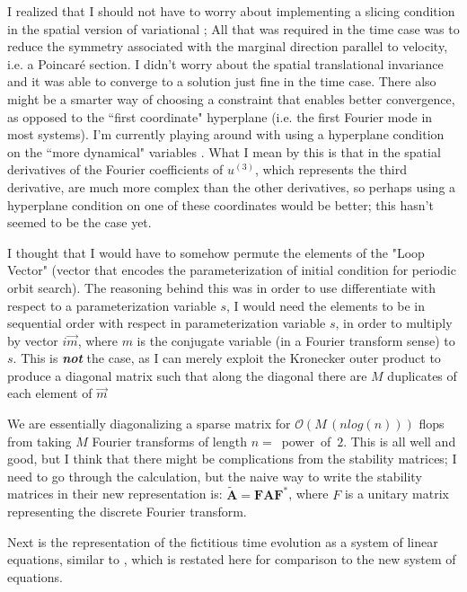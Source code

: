 I realized that I should not have to worry about implementing a slicing condition
in the spatial version of variational {\descent}; All that was required in the
time case was to reduce the symmetry associated with the marginal direction parallel to
velocity, i.e. a Poincar\'e section. I didn't worry about the spatial translational invariance
and it was able to converge to a solution just fine in the time case.
There also might be a smarter way of choosing a constraint that enables better
convergence, as opposed to the ``first coordinate" hyperplane (i.e. the first
Fourier mode in most systems). I'm currently playing around with using a
hyperplane condition on the ``more dynamical" variables . What I mean by this is that in
 the spatial derivatives of the Fourier coefficients of
$u^{(3)}$, which represents the third derivative, are much more complex than
the other derivatives, so perhaps using a hyperplane condition on one of these
coordinates would be better; this hasn't seemed to be the case yet.

I thought that I would have to somehow permute the elements  of the "Loop Vector" (vector that
encodes the parameterization of initial condition for periodic orbit search). The reasoning behind this
was in order to use differentiate with respect to a parameterization variable $s$, I would need
the elements to be in sequential order with respect in parameterization variable $s$, in order to
multiply by vector $i \vec{m}$, where $m$ is the conjugate variable (in a Fourier transform sense)
to $s$. This is \textbf{\emph{not}}
the case, as I can merely exploit the Kronecker outer product to produce a diagonal matrix such that
along the diagonal there are $M$ duplicates of each element of $\vec{m}$

We are essentially diagonalizing a sparse matrix for $\mathcal{O}(M\,(n log(n)))$ flops
from taking $M$ Fourier transforms of length $n =$~power~of~$2$.
This is all well and good, but I think that there might be complications from the stability matrices;
I need to go through the calculation, but the naive way to write the
stability matrices in their new representation is:
 $\tilde{\mathbf{A}} = \mathbf{F} \mathbf{A} \mathbf{F^{*}}$, where $F$
is a unitary matrix representing the discrete Fourier transform.

Next is the representation of the fictitious time evolution as a system of linear equations, similar to
, which is restated here for comparison to the new system of equations.

